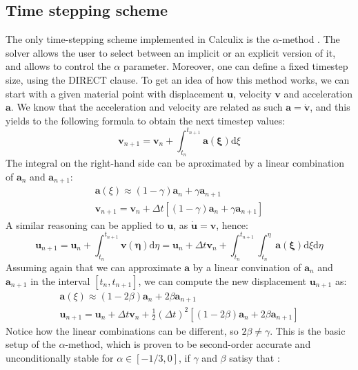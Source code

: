 \documentclass[
  english,        %
  font=times,     %
  onecolumn,      %
]{tumarticle}
\begin{document}
\subsection{Time stepping scheme}
The only time-stepping scheme implemented in Calculix is the $\alpha$-method \cite{dhondt2017calculix}. The solver allows the user to select between an implicit or an explicit version of it, and allows to control the $\alpha$ parameter. Moreover, one can define a fixed timestep size, using the DIRECT clause. To get an idea of how this method works, we can start with a given material point with displacement $\boldsymbol{u}$, velocity $\boldsymbol{v}$ and acceleration $\boldsymbol{a}$. We know that the acceleration and velocity are related as such $\boldsymbol{a} = \dot{\boldsymbol{v}}$, and this yields to the following formula to obtain the next timestep values:
\begin{equation}
    \boldsymbol{v}_{n+1} = \boldsymbol{v}_n + \int_{t_n}^{t_{n+1}} \boldsymbol{a(\xi)} \text{d}\xi
\end{equation}
The integral on the right-hand side can be aproximated by a linear combination of $ \boldsymbol{a}_n$ and $\boldsymbol{a}_{n+1}$:
\begin{gather}
    \boldsymbol{a}(\xi) \approx  (1 - \gamma) \boldsymbol{a}_n + \gamma \boldsymbol{a}_{n+1}\\
    \boldsymbol{v}_{n+1} = \boldsymbol{v}_n + \Delta t \left[ (1 - \gamma) \boldsymbol{a}_n + \gamma \boldsymbol{a}_{n+1} \right]
\end{gather} 
A similar reasoning can be applied to $\boldsymbol{u}$, as $\boldsymbol{\dot{u}} = \boldsymbol{v}$, hence:
\begin{equation}
    \boldsymbol{u}_{n+1} 
    = \boldsymbol{u}_n + \int_{t_n}^{t_{n+1}} \boldsymbol{v(\eta)}  \text{d}\eta 
    = \boldsymbol{u}_n + \Delta t \boldsymbol{v}_n + \int_{t_n}^{t_{n+1}} \int_{t_n}^{\eta} \boldsymbol{a(\xi)} \text{d}\xi \text{d}\eta 
\end{equation}
Assuming again that we can approximate $\boldsymbol{a}$ by a linear convination of $ \boldsymbol{a}_n$ and $\boldsymbol{a}_{n+1}$ in the interval $\left[ t_n, t_{n+1} \right]$, we can compute the new displacement $\boldsymbol{u}_{n+1}$ as:
\begin{gather}
    \boldsymbol{a}(\xi) \approx  (1 - 2\beta) \boldsymbol{a}_n + 2\beta \boldsymbol{a}_{n+1}\\
    \boldsymbol{u}_{n+1} = \boldsymbol{u}_n + \Delta t \boldsymbol{v}_n
    + \frac{1}{2} (\Delta t)^2 \left[ (1 - 2\beta) \boldsymbol{a}_n + 2\beta \boldsymbol{a}_{n+1} \right]
\end{gather} 
Notice how the linear combinations can be different, so $2\beta \neq \gamma$. This is the basic setup of the $\alpha$-method, which is proven to be second-order accurate and unconditionally stable for $\alpha \in [-1/3, 0]$, if $\gamma$ and $\beta$ satisy that \cite{dhondt2004finite}:
\end{document}

